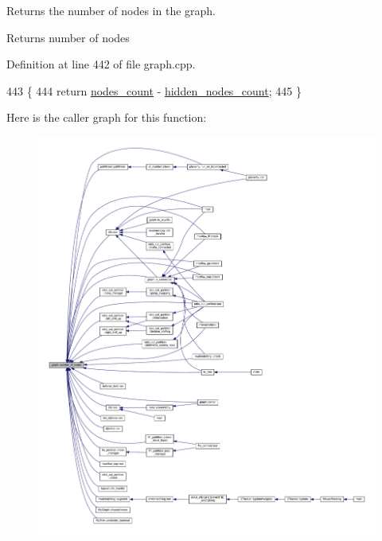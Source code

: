 Returns the number of nodes in the graph.

\begin{DoxyReturn}{Returns}
number of nodes 
\end{DoxyReturn}


Definition at line 442 of file graph.\+cpp.


\begin{DoxyCode}
443 \{
444     \textcolor{keywordflow}{return} \mbox{\hyperlink{classgraph_a1f59223d0bcf647920963d7a661dd74a}{nodes\_count}} - \mbox{\hyperlink{classgraph_aa72548d972d226a69f7f8fb92b363860}{hidden\_nodes\_count}};
445 \}
\end{DoxyCode}
Here is the caller graph for this function\+:
\nopagebreak
\begin{figure}[H]
\begin{center}
\leavevmode
\includegraphics[width=350pt]{classgraph_a42c78e0a9f115655e3ff0efe35ebfc4e_icgraph}
\end{center}
\end{figure}
\mbox{\label{classgraph_a870633528590b7925cd27776bdd2bbd2}} 
